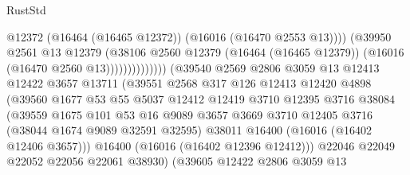 \begin{lexlean}{RustStd}
\begin{coremodule}
                                              @12372
                                              (@16464 (@16465 @12372))
                                              (@16016 (@16470 @2553 @13))))
                                          (@39950
                                            @2561
                                            @13
                                            @12379
                                            (@38106
                                              @2560
                                              @12379
                                              (@16464 (@16465 @12379))
                                              (@16016 (@16470 @2560 @13))))))))))))))
                      (@39540
                        @2569
                        @2806
                        @3059
                        @13
                        @12413
                        @12422
                        @3657
                        @13711
                        (@39551
                          @2568
                          @317
                          @126
                          @12413
                          @12420
                          @4898
                          (@39560
                            @1677
                            @53
                            @55
                            @5037
                            @12412
                            @12419
                            @3710
                            @12395
                            @3716
                            @38084
                            (@39559
                              @1675
                              @101
                              @53
                              @16
                              @9089
                              @3657
                              @3669
                              @3710
                              @12405
                              @3716
                              (@38044 @1674 @9089 @32591 @32595)
                              @38011
                              @16400
                              (@16016 (@16402 @12406 @3657)))
                            @16400
                            (@16016 (@16402 @12396 @12412)))
                          @22046
                          @22049
                          @22052
                          @22056
                          @22061
                          @38930)
                        (@39605
                          @12422
                          @2806
                          @3059
                          @13

\end{coremodule}
\end{lexlean}
